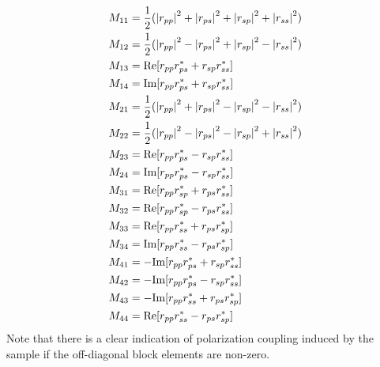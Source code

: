 \begin{subequations}
\begin{align}
    M_{11} &= \frac{1}{2}(\left| r_{pp} \right|^2 + \left| r_{ps} \right|^2 + \left| r_{sp} \right|^2 + \left| r_{ss} \right|^2)    \\
    M_{12} &= \frac{1}{2}(\left| r_{pp} \right|^2 - \left| r_{ps} \right|^2 + \left| r_{sp} \right|^2 - \left| r_{ss} \right|^2)     \\
    M_{13} &= \text{Re}[r_{pp}r_{ps}^* + r_{sp}r_{ss}^*]    \\
    M_{14} &= \text{Im}[r_{pp}r_{ps}^* + r_{sp}r_{ss}^*]    \\
    M_{21} &= \frac{1}{2}(\left| r_{pp} \right|^2 + \left| r_{ps} \right|^2 - \left| r_{sp} \right|^2 - \left| r_{ss} \right|^2)     \\
    M_{22} &= \frac{1}{2}(\left| r_{pp} \right|^2 - \left| r_{ps} \right|^2 - \left| r_{sp} \right|^2 + \left| r_{ss} \right|^2)     \\
    M_{23} &= \text{Re}[r_{pp}r_{ps}^* - r_{sp}r_{ss}^*]    \\
    M_{24} &= \text{Im}[r_{pp}r_{ps}^* - r_{sp}r_{ss}^*]    \\
    M_{31} &= \text{Re}[r_{pp}r_{sp}^* + r_{ps}r_{ss}^*]    \\
    M_{32} &= \text{Re}[r_{pp}r_{sp}^* - r_{ps}r_{ss}^*]    \\
    M_{33} &= \text{Re}[r_{pp}r_{ss}^* + r_{ps}r_{sp}^*]    \\
    M_{34} &= \text{Im}[r_{pp}r_{ss}^* - r_{ps}r_{sp}^*]    \\
    M_{41} &= -\text{Im}[r_{pp}r_{ps}^* + r_{sp}r_{ss}^*]    \\
    M_{42} &= -\text{Im}[r_{pp}r_{ps}^* - r_{sp}r_{ss}^*]    \\
    M_{43} &= -\text{Im}[r_{pp}r_{ss}^* + r_{ps}r_{sp}^*]    \\
    M_{44} &= \text{Re}[r_{pp}r_{ss}^* - r_{ps}r_{sp}^*]    \\
\end{align}
    \label{eq:JonesToMueller}
\end{subequations}
Note that there is a clear indication of polarization coupling induced by the sample if the off-diagonal block elements are non-zero.

